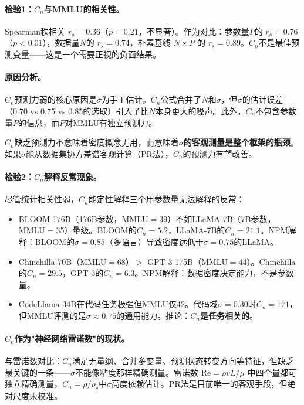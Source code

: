 \documentclass[11pt,a4paper]{article}
\newcommand{\rhoc}{\rho_c}
\begin{document}
\paragraph{检验1：$C_n$与MMLU的相关性。}
Spearman秩相关 $r_s=0.36$（$p=0.21$，不显著）。作为对比：参数量$P$的 $r_s=0.76$（$p<0.01$），数据量$N$的 $r_s=0.74$，朴素基线 $N\times P$ 的 $r_s=0.89$。$C_n$不是最佳预测变量——这是一个需要正视的负面结果。

\paragraph{原因分析。}
$C_n$预测力弱的核心原因是$\sigma$为手工估计。$C_n$公式合并了$N$和$\sigma$，但$\sigma$的估计误差（0.70 vs 0.75 vs 0.85的选取）引入了比$N$本身更大的噪声。此外，$C_n$不包含参数量$P$的信息，而$P$对MMLU有独立预测力。

$C_n$缺乏预测力不意味着密度概念无用，而意味着\textbf{$\sigma$的客观测量是整个框架的瓶颈}。如果$\sigma$能从数据集协方差谱客观计算（PR法），$C_n$的预测力有望改善。

\paragraph{检验2：$C_n$解释反常现象。}
尽管统计相关性弱，$C_n$能定性解释三个用参数量无法解释的反常：

\begin{itemize}[nosep]
  \item BLOOM-176B（176B参数，MMLU$=$39）不如LLaMA-7B（7B参数，MMLU$=$35）量级。BLOOM的$C_n=5.2$，LLaMA-7B的$C_n=21.1$。NPM解释：BLOOM的$\sigma=0.85$（多语言）导致密度远低于$\sigma=0.75$的LLaMA。
  \item Chinchilla-70B（MMLU$=$68）$>$ GPT-3-175B（MMLU$=$44）。Chinchilla的$C_n=29.5$，GPT-3的$C_n=6.3$。NPM解释：数据密度决定能力，不是参数量。
  \item CodeLlama-34B在代码任务极强但MMLU仅42。代码域$\sigma=0.30$时$C_n=171$，但MMLU评测的是$\sigma\approx0.75$的通用能力。推论：\textbf{$C_n$是任务相关的}。
\end{itemize}

\paragraph{$C_n$作为"神经网络雷诺数"的现状。}
与雷诺数对比：$C_n$满足无量纲、合并多变量、预测状态转变方向等特征，但缺乏最关键的一条——$\sigma$不能像粘度那样精确测量。雷诺数 $\text{Re}=\rho vL/\mu$ 中四个量都可独立精确测量，$C_n=\rho/\rhoc$中$\sigma$高度依赖估计。PR法是目前唯一的客观手段，但绝对尺度未校准。
\end{document}
